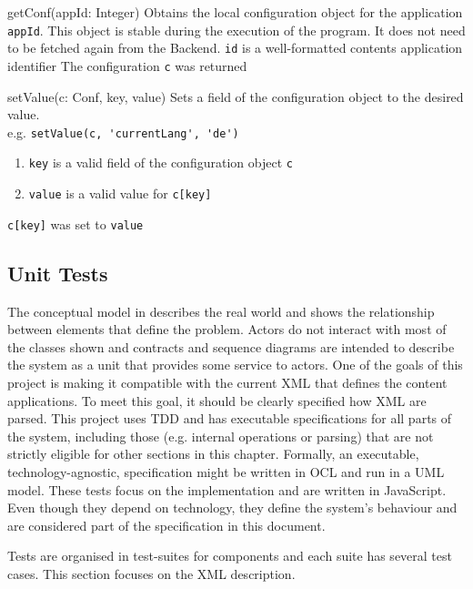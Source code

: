 \begin{sopcontract}{getConf(appId: Integer)}
{Obtains the local configuration object for the application \texttt{appId}. This object is stable during the execution of the program. It does not need to be fetched again from the Backend.}
{\texttt{id} is a well-formatted contents application identifier}
{The configuration \texttt{c} was returned}
\end{sopcontract}

\begin{sopcontract}{setValue(c: Conf, key, value)}
{Sets a field of the configuration object to the desired value.\\ e.g. \lstinline$setValue(c, 'currentLang', 'de')$}
{
\begin{enumerate}
    \item \texttt{key} is a valid field of the configuration object \texttt{c}
    \item \texttt{value} is a valid value for \lstinline$c[key]$
\end{enumerate}
}
{\lstinline$c[key]$ was set to \texttt{value}}
\end{sopcontract}

\subsection{Unit Tests}
The conceptual model in  describes the real world and shows the relationship between elements that define the problem.
Actors do not interact with most of the classes shown and contracts and sequence diagrams are intended to describe the system as a unit that provides some service to actors.
One of the goals of this project is making it compatible with the current \ac{XML} that defines the content applications.
To meet this goal, it should be clearly specified how \ac{XML} are parsed.
This project uses \ac{TDD} and has executable specifications for all parts of the system, including those (e.g. internal operations or parsing) that are not strictly eligible for other sections in this chapter.
Formally, an executable, technology-agnostic, specification might be written in \ac{OCL} and run in a \ac{UML} model.
These tests focus on the implementation and are written in JavaScript.
Even though they depend on technology, they define the system's behaviour and are considered part of the specification in this document.

Tests are organised in test-suites for components and each suite has several test cases.
This section focuses on the \ac{XML} description.

